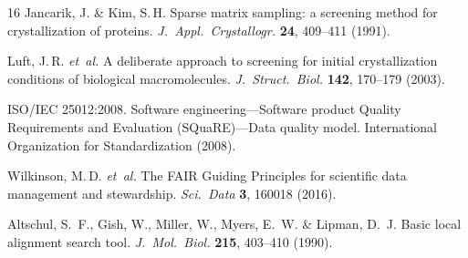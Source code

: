 \documentclass[11pt]{article}
\begin{document}
\begin{thebibliography}{16}
Jancarik, J. \& Kim, S.\,H.
Sparse matrix sampling: a screening method for crystallization of proteins.
\textit{J.\ Appl.\ Crystallogr.} \textbf{24}, 409--411 (1991).

Luft, J.\,R. \textit{et~al.}
A deliberate approach to screening for initial crystallization conditions of biological macromolecules.
\textit{J.\ Struct.\ Biol.} \textbf{142}, 170--179 (2003).

ISO/IEC 25012:2008.
Software engineering---Software product Quality Requirements and Evaluation (SQuaRE)---Data quality model.
International Organization for Standardization (2008).

Wilkinson, M.\,D. \textit{et~al.}
The FAIR Guiding Principles for scientific data management and stewardship.
\textit{Sci.\ Data} \textbf{3}, 160018 (2016).

Altschul, S.~F., Gish, W., Miller, W., Myers, E.~W. \& Lipman, D.~J.
Basic local alignment search tool.
\textit{J.\ Mol.\ Biol.} \textbf{215}, 403--410 (1990).

\end{thebibliography}
\end{document}
